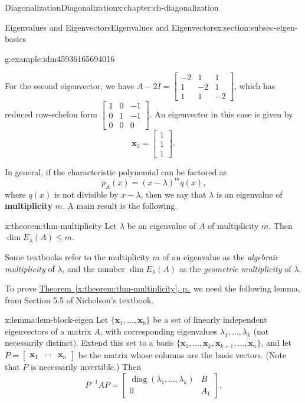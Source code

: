 \documentclass[oneside,10pt,]{book}
\newcommand{\xreffont}{\relax}
\newcommand{\terminology}[1]{\textbf{#1}}
\numberwithin{equation}{section}
\newcommand{\bbm}{\begin{bmatrix}}
\newcommand{\ebm}{\end{bmatrix}}
\newcommand{\diag}{\operatorname{diag}}
\newcommand{\xx}{\mathbf{x}}
\newcommand{\amp}{&}
\begin{document}
\begin{chapterptx}{Diagonalization}{}{Diagonalization}{}{}{x:chapter:ch-diagonalization}
\begin{sectionptx}{Eigenvalues and Eigenvectors}{}{Eigenvalues and Eigenvectors}{}{}{x:section:subsec-eigen-basics}
\begin{example}{}{g:example:idm45936165694016}
\begin{equation*}
\end{equation*}
%
\par
For the second eigenvector, we have \(A-2I = \bbm -2\amp 1\amp 1\\1\amp -2\amp 1\\1\amp 1\amp -2\ebm\), which has reduced row-echelon form \(\bbm 1\amp 0\amp -1\\0\amp 1\amp -1\\0\amp 0\amp 0\ebm\). An eigenvector in this case is given by%
\begin{equation*}
\xx_2 = \bbm 1\\1\\1\ebm\text{.}
\end{equation*}
%
\end{example}
In general, if the characteristic polynomial can be factored as%
\begin{equation*}
p_A(x)=(x-\lambda)^mq(x)\text{,}
\end{equation*}
where \(q(x)\) is not divisible by \(x-\lambda\), then we say that \(\lambda\) is an eigenvalue of \terminology{multiplicity} \(m\). A main result is the following.%
\begin{theorem}{}{}{x:theorem:thm-multiplicity}%
Let \(\lambda\) be an eigenvalue of \(A\) of multiplicity \(m\). Then \(\dim E_\lambda(A)\leq m\).%
\end{theorem}
Some textbooks refer to the multiplicity \(m\) of an eigenvalue as the \emph{algebraic multiplicity} of \(\lambda\), and the number \(\dim E_\lambda(A)\) as the \emph{geometric multiplicity} of \(\lambda\).%
\par
To prove \hyperref[x:theorem:thm-multiplicity]{Theorem~{\xreffont\ref{x:theorem:thm-multiplicity}}, p.\,\pageref{x:theorem:thm-multiplicity}} we need the following lemma, from Section 5.5 of Nicholson's textbook.%
\begin{lemma}{}{}{x:lemma:lem-block-eigen}%
Let \(\{\xx_1,\ldots, \xx_k\}\) be a set of linearly independent eigenvectors of a matrix \(A\), with corresponding eigenvalues \(\lambda_1,\ldots, \lambda_k\) (not necessarily distinct). Extend this set to a basis \(\{\xx_1,\ldots, \xx_k,\xx_{k+1},\ldots, \xx_n\}\), and let \(P=\bbm \xx_1\amp \cdots \amp \xx_n\ebm\) be the matrix whose columns are the basis vectors. (Note that \(P\) is necessarily invertible.) Then%
\begin{equation*}
P^{-1}AP = \bbm \diag(\lambda_1,\ldots, \lambda_k) \amp B\\0\amp A_1\ebm\text{,}
\end{equation*}

\end{lemma}
\end{sectionptx}
\end{chapterptx}
\end{document}
